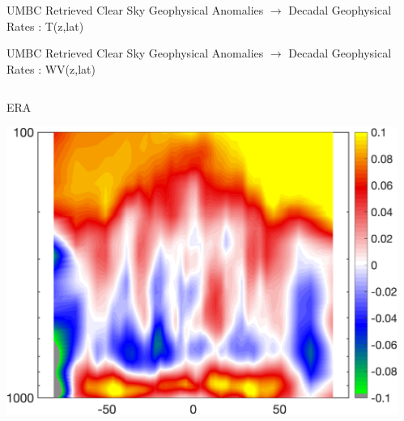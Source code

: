 \documentclass[10pt,t]{beamer}
\begin{document}
\begin{frame}{UMBC Retrieved Clear Sky Geophysical Anomalies $\rightarrow$ Decadal Geophysical Rates : T(z,lat)}
\end{frame}


\begin{frame}{UMBC Retrieved Clear Sky Geophysical Anomalies $\rightarrow$ Decadal Geophysical Rates : WV(z,lat)}
\vspace{-0.35in}

\begin{columns}
\begin{column}{0.45\columnwidth}
\begin{block}{\footnotesize ERA}
\vspace{-0.1in}
\begin{center}
\includegraphics[width=0.95\linewidth]{Figs/ClearAnom/rawERAwvrates.png}
\end{center}
\end{block}
\end{column}

\begin{column}{0.45\columnwidth}
\end{column}
\end{columns}

\vspace{-0.25in}


\end{frame}
\end{document}
